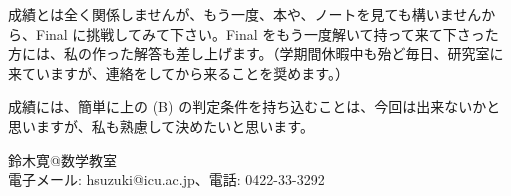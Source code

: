 {成績とは全く関係しませんが、もう一度、本や、ノートを見ても構いませんから、Final に挑戦してみて下さい。Final をもう一度解いて持って来て下さった方には、私の作った解答も差し上げます。（学期間休暇中も殆ど毎日、研究室に来ていますが、連絡をしてから来ることを奨めます。）

成績には、簡単に上の (B) の判定条件を持ち込むことは、今回は出来ないかと思いますが、私も熟慮して決めたいと思います。

\medskip
\begin{flushright}
鈴木寛@数学教室\\
電子メール: hsuzuki@icu.ac.jp、電話: 0422-33-3292
\end{flushright}


}

